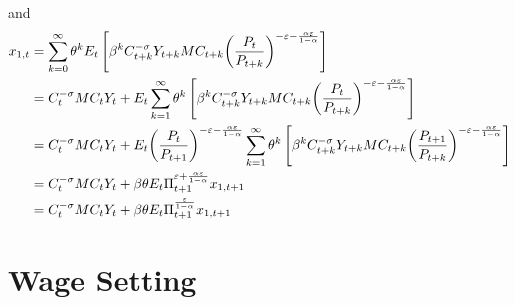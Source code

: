 \documentclass[12pt,a4paper]{article}
\begin{document}
and
\begin{align}
  {x_{1,t}} &= \sum\limits_{k = 0}^\infty  {{\theta ^k}{E_t}\left[ {{\beta ^k}C_{t + k}^{ - \sigma }{Y_{t + k}}M{C_{t + k}}{{\left( {\frac{{{P_t}}}{{{P_{t + k}}}}} \right)}^{ - \varepsilon  - \frac{{\alpha \varepsilon }}{{1 - \alpha }}}}} \right]}  \hfill \\
   &= C_t^{ - \sigma }M{C_t}{Y_t} + {E_t}\sum\limits_{k = 1}^\infty  {{\theta ^k}\left[ {{\beta ^k}C_{t + k}^{ - \sigma }{Y_{t + k}}M{C_{t + k}}{{\left( {\frac{{{P_t}}}{{{P_{t + k}}}}} \right)}^{ - \varepsilon  - \frac{{\alpha \varepsilon }}{{1 - \alpha }}}}} \right]}  \hfill \\
   &= C_t^{ - \sigma }M{C_t}{Y_t} + {E_t}{\left( {\frac{{{P_t}}}{{{P_{t + 1}}}}} \right)^{ - \varepsilon  - \frac{{\alpha \varepsilon }}{{1 - \alpha }}}}\sum\limits_{k = 1}^\infty  {{\theta ^k}\left[ {{\beta ^k}C_{t + k}^{ - \sigma }{Y_{t + k}}M{C_{t + k}}{{\left( {\frac{{{P_{t + 1}}}}{{{P_{t + k}}}}} \right)}^{ - \varepsilon  - \frac{{\alpha \varepsilon }}{{1 - \alpha }}}}} \right]}  \hfill \\
   &= C_t^{ - \sigma }M{C_t}{Y_t} + \beta \theta {E_t}\Pi _{t + 1}^{\varepsilon  + \frac{{\alpha \varepsilon }}{{1 - \alpha }}}{x_{1,t + 1}} \hfill \\
   &= C_t^{ - \sigma }M{C_t}{Y_t} + \beta \theta {E_t}\Pi _{t + 1}^{\frac{\varepsilon }{{1 - \alpha }}}{x_{1,t + 1}}
\end{align}

\section{Wage Setting}
\end{document}
